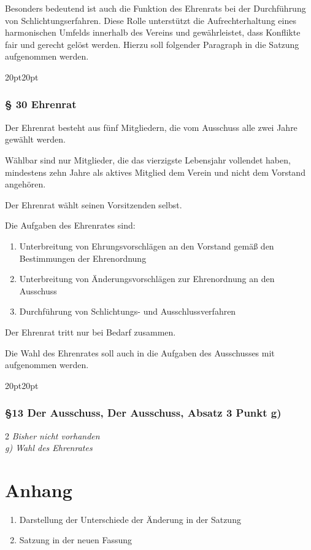 \documentclass[10pt,a4paper,parskip=half]{scrartcl}
\newcommand{\change}[1]{
  \begin{adjustwidth}{20pt}{20pt}
    #1
  \end{adjustwidth}
}
\newcommand{\compare}[3]{\change{\subsubsection*{#1}\begin{multicols}{2}#2\columnbreak\\#3\end{multicols}}}
\begin{document}
Besonders bedeutend ist auch die Funktion des Ehrenrats bei der Durchführung von Schlichtungserfahren. Diese Rolle unterstützt die Aufrechterhaltung eines harmonischen Umfelds innerhalb des Vereins und gewährleistet, dass Konflikte fair und gerecht gelöst werden.
Hierzu soll folgender Paragraph in die Satzung aufgenommen werden.
\change{
  \subsubsection*{§ 30 Ehrenrat}
  Der Ehrenrat besteht aus fünf Mitgliedern, die vom Ausschuss alle zwei Jahre gewählt werden.

  Wählbar sind nur Mitglieder, die das vierzigste Lebensjahr vollendet haben, mindestens zehn Jahre als aktives Mitglied dem Verein und nicht dem Vorstand angehören.

  Der Ehrenrat wählt seinen Vorsitzenden selbst.

  Die Aufgaben des Ehrenrates sind:

  \begin{enumerate}[label=\alph*),noitemsep]
    \item Unterbreitung von Ehrungsvorschlägen an den Vorstand gemäß den Bestimmungen der Ehrenordnung
    \item Unterbreitung von Änderungsvorschlägen zur Ehrenordnung an den Ausschuss
    \item Durchführung von Schlichtungs- und Ausschlussverfahren
  \end{enumerate}

  Der Ehrenrat tritt nur bei Bedarf zusammen.
}

Die Wahl des Ehrenrates soll auch in die Aufgaben des Ausschusses mit aufgenommen werden.

\compare{§13 Der Ausschuss, Der Ausschuss, Absatz 3 Punkt g)}{
  \em Bisher nicht vorhanden \em
} {
  g) Wahl des Ehrenrates
}


\section{Anhang}
\begin{enumerate}
  \item Darstellung der Unterschiede der Änderung in der Satzung
  \item Satzung in der neuen Fassung
\end{enumerate}



\end{document}
